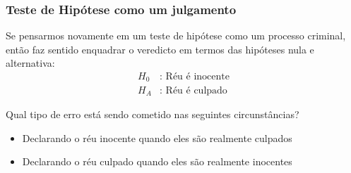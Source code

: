 \documentclass[11pt]{beamer}
\begin{document}

\begin{frame}
\frametitle{Teste de Hipótese como um julgamento}

Se pensarmos novamente em um teste de hipótese como um processo criminal, então faz sentido enquadrar o veredicto em termos das hipóteses nula e alternativa:
\begin{align*}
H_0&:\text{ Réu é inocente} \\
H_A&:\text{ Réu é culpado}
\end{align*}

Qual tipo de erro está sendo cometido nas seguintes circunstâncias?

\begin{itemize}
\item Declarando o réu inocente quando eles são realmente culpados
\item Declarando o réu culpado quando eles são realmente inocentes
\end{itemize}

\end{frame}

\end{document}
